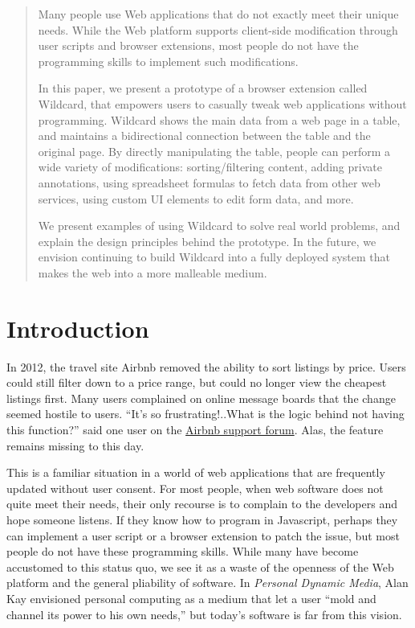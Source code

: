 \documentclass[english,submission]{programming}
\begin{document}
\begin{abstract}
Many people use Web applications that do not exactly meet their unique
needs. While the Web platform supports client-side modification through
user scripts and browser extensions, most people do not have the
programming skills to implement such modifications.

In this paper, we present a prototype of a browser extension called
Wildcard, that empowers users to casually tweak web applications without
programming. Wildcard shows the main data from a web page in a table,
and maintains a bidirectional connection between the table and the
original page. By directly manipulating the table, people can perform a
wide variety of modifications: sorting/filtering content, adding private
annotations, using spreadsheet formulas to fetch data from other web
services, using custom UI elements to edit form data, and more.

We present examples of using Wildcard to solve real world problems, and
explain the design principles behind the prototype. In the future, we
envision continuing to build Wildcard into a fully deployed system that
makes the web into a more malleable medium.
\end{abstract}


\hypertarget{introduction}{%
\section{Introduction}\label{introduction}}

In 2012, the travel site Airbnb removed the ability to sort listings by
price. Users could still filter down to a price range, but could no
longer view the cheapest listings first. Many users complained on online
message boards that the change seemed hostile to users. ``It's so
frustrating!..What is the logic behind not having this function?'' said
one user on the
\href{https://community.withairbnb.com/t5/Hosting/Sorting-listing-by-price/td-p/559404}{Airbnb
support forum}. Alas, the feature remains missing to this day.

This is a familiar situation in a world of web applications that are
frequently updated without user consent. For most people, when web
software does not quite meet their needs, their only recourse is to
complain to the developers and hope someone listens. If they know how to
program in Javascript, perhaps they can implement a user script or a
browser extension to patch the issue, but most people do not have these
programming skills. While many have become accustomed to this status
quo, we see it as a waste of the openness of the Web platform and the
general pliability of software. In \emph{Personal Dynamic Media}, Alan
Kay envisioned personal computing as a medium that let a user ``mold and
channel its power to his own needs,'' but today's software is far from
this vision.
\end{document}
